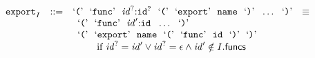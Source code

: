 $$\begin{array}[t]{@{}lrrl@{}l@{}l@{}l@{}}
{\begin{array}[t]{@{}l@{}l@{}l@{}}
{\begin{array}[t]{@{}l@{}}
\end{array}
} \\
\end{array}
} \\
& {{\mathtt{export}}}_{I} & ::= & \mbox{‘\texttt{{(}}’}~~\mbox{‘\texttt{func}’}~~{{\mathit{id}}^?}{:}{{\mathtt{id}}^?}~~\mbox{‘\texttt{{(}}’}~~\mbox{‘\texttt{export}’}~~{\mathtt{name}}~~\mbox{‘\texttt{{)}}’}~~\ldots~~\mbox{‘\texttt{{)}}’} & \quad\equiv\quad{} & & \\
&&& \multicolumn{4}{@{}l@{}}{\quad
\begin{array}[t]{@{}l@{}l@{}l@{}}
\begin{array}[t]{@{}l@{}} \mbox{‘\texttt{{(}}’}~~\mbox{‘\texttt{func}’}~~{\mathit{id}'}{:}{\mathtt{id}}~~\ldots~~\mbox{‘\texttt{{)}}’} \\
  \mbox{‘\texttt{{(}}’}~~\mbox{‘\texttt{export}’}~~{\mathtt{name}}~~\mbox{‘\texttt{{(}}’}~~\mbox{‘\texttt{func}’}~~{\mathtt{id}}~~\mbox{‘\texttt{{)}}’}~~\mbox{‘\texttt{{)}}’} \end{array} & & \\
 \multicolumn{3}{@{}l@{}}{\quad
\begin{array}[t]{@{}l@{}}
\quad \mbox{if}~ {{\mathit{id}}^?} = {\mathit{id}'} \lor {{\mathit{id}}^?} = \epsilon \land {\mathit{id}'} \notin I{.}\mathsf{funcs} \\
\end{array}
} \\
\end{array}
} \\
\end{array}
$$

\vspace{1ex}

